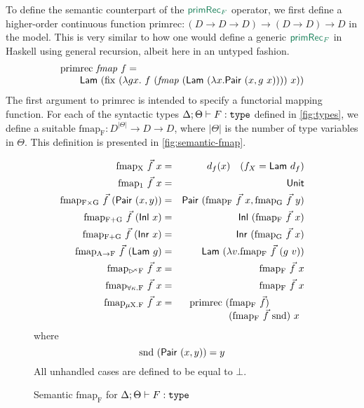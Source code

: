 To define the semantic counterpart of the $\elim{primRec$_F$}$
operator, we first define a higher-order continuous function
$\mathrm{primrec} : (D \to D \to D) \to (D \to D) \to D$ in the
model. This is very similar to how one would define a generic
$\elim{primRec$_F$}$ in Haskell using general recursion, albeit here
in an untyped fashion.
\begin{displaymath}
  \begin{array}{l}
    \mathrm{primrec}\ \mathit{fmap}\ f = \\
    \quad\quad\semCons{Lam}\ (\mathrm{fix}\ (\lambda g x.\ f\ (\mathit{fmap}\ (\semCons{Lam}\ (\lambda x. \semCons{Pair}\ (x, g\ x))))\ x))
  \end{array}
\end{displaymath}
The first argument to $\mathrm{primrec}$ is intended to specify a
functorial mapping function. For each of the syntactic types $\Delta;
\Theta \vdash F : \texttt{\textup{type}}$ defined in \autoref{fig:types}, we define
a suitable $\mathrm{fmap_F} : D^{|\Theta|} \to D \to D$, where
$|\Theta|$ is the number of type variables in $\Theta$. This
definition is presented in \autoref{fig:semantic-fmap}.

\begin{figure}[t]
  \begin{eqnarray*}
    \mathrm{fmap_X}\ \vec{f}\ x & = & d_f(x)\quad (f_X = \semCons{Lam}\ d_f) \\
    \mathrm{fmap_1}\ \vec{f}\ x & = & \semCons{Unit} \\
    \mathrm{fmap_{F \times G}}\ \vec{f}\ (\semCons{Pair}\ (x,y)) & = & \semCons{Pair}\ (\mathrm{fmap_F}\ \vec{f}\ x, \mathrm{fmap_G}\ \vec{f}\ y) \\
    \mathrm{fmap_{F + G}}\ \vec{f}\ (\semCons{Inl}\ x) & = & \semCons{Inl}\ (\mathrm{fmap_F}\ \vec{f}\ x) \\
    \mathrm{fmap_{F + G}}\ \vec{f}\ (\semCons{Inr}\ x) & = & \semCons{Inr}\ (\mathrm{fmap_G}\ \vec{f}\ x) \\
    \mathrm{fmap_{A \to F}}\ \vec{f}\ (\semCons{Lam}\ g) & = & \semCons{Lam}\ (\lambda v. \mathrm{fmap_F}\ \vec{f}\ (g\ v)) \\
    \mathrm{fmap_{\delayX\kappa F}}\ \vec{f}\ x & = & \mathrm{fmap_F}\ \vec{f}\ x \\
    \mathrm{fmap_{\forall\kappa.F}}\ \vec{f}\ x & = & \mathrm{fmap_F}\ \vec{f}\ x \\
    \mathrm{fmap_{\mu X. F}}\ \vec{f}\ x & = &
    \begin{array}[t]{@{}l}
      \mathrm{primrec}\ (\mathrm{fmap_F}\ \vec{f})\ \\
      \quad\quad\quad\quad(\mathrm{fmap_F}\ \vec{f}\ \mathrm{snd})\ x
    \end{array}
  \end{eqnarray*}
  where
  \begin{displaymath}
    \mathrm{snd}\ (\semCons{Pair}\ (x,y)) = y
  \end{displaymath}
  All unhandled cases are defined to be equal to $\bot$.
  \caption{Semantic $\mathrm{fmap_F}$ for $\Delta; \Theta \vdash F : \texttt{\textup{type}}$}
  \label{fig:semantic-fmap}
\end{figure}

